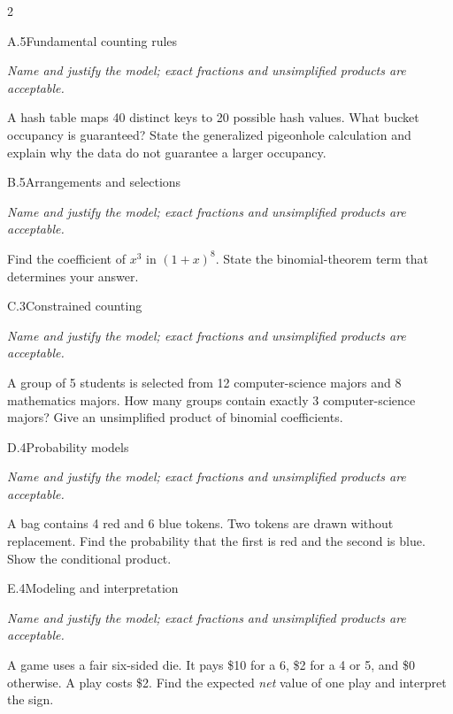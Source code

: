 \documentclass[9pt]{extarticle}
\begin{document}
\CoreWorkArea
\FormBreak
{}
\begin{multicols}{2}
\begin{CoreProblem}{A.5}{Fundamental counting rules}
{\scriptsize\textit{Name and justify the model; exact fractions and unsimplified products are acceptable.}\par}
A hash table maps 40 distinct keys to 20 possible hash values. What
    bucket occupancy is guaranteed? State the generalized pigeonhole calculation
    and explain why the data do not guarantee a larger occupancy.
\end{CoreProblem}
\begin{CoreProblem}{B.5}{Arrangements and selections}
{\scriptsize\textit{Name and justify the model; exact fractions and unsimplified products are acceptable.}\par}
Find the coefficient of $x^3$ in $(1+x)^8$. State the binomial-theorem
    term that determines your answer.
\end{CoreProblem}
\begin{CoreProblem}{C.3}{Constrained counting}
{\scriptsize\textit{Name and justify the model; exact fractions and unsimplified products are acceptable.}\par}
A group of 5 students is selected from 12 computer-science majors and
    8 mathematics majors. How many groups contain exactly 3 computer-science
    majors? Give an unsimplified product of binomial coefficients.
\end{CoreProblem}
\columnbreak
\begin{CoreProblem}{D.4}{Probability models}
{\scriptsize\textit{Name and justify the model; exact fractions and unsimplified products are acceptable.}\par}
A bag contains 4 red and 6 blue tokens. Two tokens are drawn without
    replacement. Find the probability that the first is red and the second is
    blue. Show the conditional product.
\end{CoreProblem}
\begin{CoreProblem}{E.4}{Modeling and interpretation}
{\scriptsize\textit{Name and justify the model; exact fractions and unsimplified products are acceptable.}\par}
A game uses a fair six-sided die. It pays \$10 for a 6, \$2 for a 4
    or 5, and \$0 otherwise. A play costs \$2. Find the expected \emph{net}
    value of one play and interpret the sign.
\end{CoreProblem}
\end{multicols}
\end{document}
